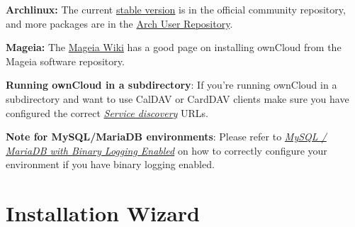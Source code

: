 \documentclass[letterpaper,10pt,english]{sphinxmanual}
\begin{document}
\textbf{Archlinux:} The current \href{https://www.archlinux.org/packages/community/any/owncloud}{stable version} is in the
official community repository, and more packages are in
the \href{https://aur.archlinux.org/packages/?O=0\&K=owncloud}{Arch User Repository}.

\textbf{Mageia:} The \href{https://wiki.mageia.org/en/OwnCloud}{Mageia Wiki} has a good page on installing ownCloud from the
Mageia software repository.

\textbf{Running ownCloud in a subdirectory}: If you're running ownCloud in a
subdirectory and want to use CalDAV or CardDAV clients make sure you have
configured the correct {\hyperref[issues/general_troubleshooting:service-discovery-label]{\emph{Service discovery}}} URLs.

\textbf{Note for MySQL/MariaDB environments}: Please refer to {\hyperref[configuration_database/linux_database_configuration:db-binlog-label]{\emph{MySQL / MariaDB with Binary Logging Enabled}}}
on how to correctly configure your environment if you have binary logging enabled.


\section{Installation Wizard}
\label{installation/installation_wizard:installation-wizard}\label{installation/installation_wizard:open-build-service}\label{installation/installation_wizard::doc}
\end{document}
